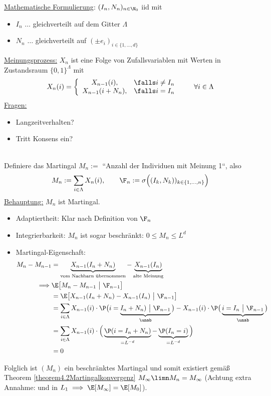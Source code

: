 \begin{beisp}[Wählermodell]
\ul{Mathematische Formulierung}: $(I_n,N_n)_{n\in\N_0}$ iid mit 
\begin{itemize}
\item $I_n$ $\ldots$ gleichverteilt auf dem Gitter $\Lambda$
\item $N_n$ $\ldots$ gleichverteilt auf $(\pm e_i)_{i\in\lbrace1,\ldots,d\rbrace}$
\end{itemize}
\ul{Meinungsprozess:} $X_n$ ist eine Folge von Zufallsvariablen mit Werten in Zustandsraum $\lbrace0,1\rbrace^\Lambda$ mit
\begin{align*}
X_n(i)=\left\lbrace\begin{array}{cl}
X_{n-1}(i), &\falls i\neq I_n\\
X_{n-1}(i+N_n),&\falls i=I_n
\end{array}\right.\qquad\forall i\in\Lambda
\end{align*}
\ul{Fragen:}
\begin{itemize}
	\item Langzeitverhalten?
	\item Tritt Konsens ein?
\end{itemize}
\\
Definiere das Martingal $M_n:=$ ``Anzahl der Individuen mit Meinung 1``, also
\begin{align*}
M_n:=\sum\limits_{i\in\Lambda} X_n(i),\qquad \F_n:=\sigma\Big((I_k,N_k))_{k\in\lbrace1,\ldots,n\rbrace}\Big)
\end{align*}
\ul{Behauptung:} $M_n$ ist Martingal.
\begin{itemize}
\item Adaptiertheit: Klar nach Definition von $\F_n$
\item Integrierbarkeit: $M_n$ ist sogar beschränkt: $0\leq M_n\leq L^d$
\item Martingal-Eigenschaft:
\begin{align*}
M_n-M_{n-1}
&=\underbrace{X_{n-1}(I_n+N_n)}_{\text{vom Nachbarn übernommen}}-\underbrace{X_{n-1}(I_n)}_{\text{alte Meinung}}\\
\implies&\E\big[M_n-M_{n-1}~\big|~\F_{n-1}\big]\\
&=\E\big[X_{n-1}(I_n+N_n)-X_{n-1}(I_n)~\big|~\F_{n-1}\big]\\
&=\sum\limits_{i\in\Lambda} X_{n-1}(i)\cdot\P\big(i=\underbrace{I_n+N_n)~\big|~\F_{n-1}}_{\unab}\big)-X_{n-1}(i)\cdot\P\big(\underbrace{i=I_n~\big|~\F_{n-1}}_{\unab}\big)\\
&=\sum\limits_{i\in\Lambda} X_{n-1}(i)\cdot\Big(\underbrace{\P(i=I_n+N_n)}_{=L^{-d}}-\underbrace{\P(I_n=i)}_{=L^{-d}}\Big)\\
&=0
\end{align*}
\end{itemize}
Folglich ist $(M_n)$ ein beschränktes Martingal und somit existiert gemäß Theorem \ref{theorem4.2Martingalkonvergenz} $M_\infty\mit\limn M_n=M_\infty$ (Achtung extra Annahme: und in $L_1\implies\E[M_\infty]=\E[M_0]$).\\


\end{beisp}
